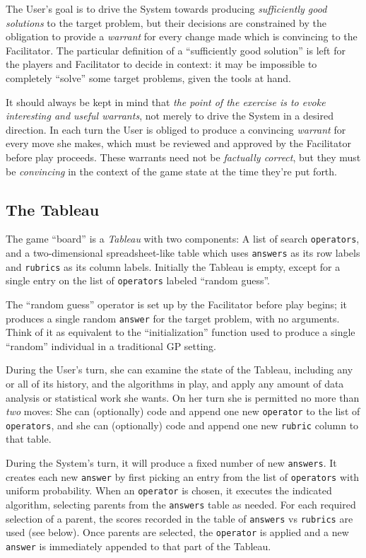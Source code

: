 The User's goal is to drive the System towards producing \emph{sufficiently good solutions} to the target problem, but their decisions are constrained by the obligation to provide a \emph{warrant} for every change made which is convincing to the Facilitator. The particular definition of a ``sufficiently good solution'' is left for the players and Facilitator to decide in context: it may be impossible to completely ``solve'' some target problems, given the tools at hand.

It should always be kept in mind that \emph{the point of the exercise is to evoke interesting and useful warrants}, not merely to drive the System in a desired direction. In each turn the User is obliged to produce a convincing \emph{warrant} for every move she makes, which must be reviewed and approved by the Facilitator before play proceeds. These warrants need not be \emph{factually correct}, but they must be \emph{convincing} in the context of the game state at the time they're put forth.

\subsection{The Tableau}\hypertarget{the-tableau}{}\label{the-tableau}

The game ``board'' is a \emph{Tableau} with two components: A list of search \texttt{operators}, and a two-dimensional spreadsheet-like table which uses \texttt{answers} as its row labels and \texttt{rubrics} as its column labels. Initially the Tableau is empty, except for a single entry on the list of \texttt{operators} labeled ``random guess''.

The ``random guess'' operator is set up by the Facilitator before play begins; it produces a single random \texttt{answer} for the target problem, with no arguments. Think of it as equivalent to the ``initialization'' function used to produce a single ``random'' individual in a traditional GP setting.

During the User's turn, she can examine the state of the Tableau, including any or all of its history, and the algorithms in play, and apply any amount of data analysis or statistical work she wants. On her turn she is permitted no more than \emph{two} moves: She can (optionally) code and append one new \texttt{operator} to the list of \texttt{operators}, and she can (optionally) code and append one new \texttt{rubric} column to that table.

During the System's turn, it will produce a fixed number of new \texttt{answers}. It creates each new \texttt{answer} by first picking an entry from the list of \texttt{operators} with uniform probability. When an \texttt{operator} is chosen, it executes the indicated algorithm, selecting parents from the \texttt{answers} table as needed. For each required selection of a parent, the scores recorded in the table of \texttt{answers} vs \texttt{rubrics} are used (see below). Once parents are selected, the \texttt{operator} is applied and a new \texttt{answer} is immediately appended to that part of the Tableau.

